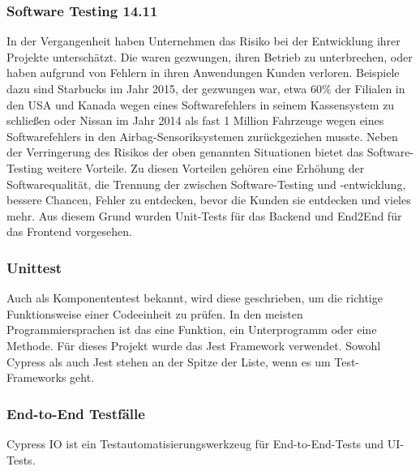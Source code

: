 \subsubsection*{Software Testing 14.11}
In der Vergangenheit haben Unternehmen das Risiko bei der Entwicklung ihrer Projekte unterschätzt. Die waren gezwungen, ihren Betrieb zu unterbrechen, oder haben aufgrund von Fehlern in ihren Anwendungen Kunden verloren. Beispiele dazu sind Starbucks im Jahr 2015, der gezwungen war, etwa 60\% der Filialen in den USA und Kanada wegen eines Softwarefehlers in seinem Kassensystem zu schließen{\cite{QS1}} oder Nissan im Jahr 2014 als fast 1 Million Fahrzeuge wegen eines Softwarefehlers in den Airbag-Sensoriksystemen zurückgeziehen musste{\cite{QS2}}. Neben der Verringerung des Risikos der oben genannten Situationen bietet das Software-Testing weitere Vorteile. Zu diesen Vorteilen gehören eine Erhöhung der Softwarequalität, die Trennung der zwischen Software-Testing und -entwicklung, bessere Chancen, Fehler zu entdecken, bevor die Kunden sie entdecken und vieles mehr. Aus diesem Grund wurden Unit-Tests für das Backend und End2End für das Frontend vorgesehen. 
\\
\subsubsection*{Unittest}
Auch als Komponententest bekannt, wird diese geschrieben, um die richtige Funktionsweise einer Codeeinheit zu prüfen. In den meisten Programmiersprachen ist das eine Funktion, ein Unterprogramm oder eine Methode. Für dieses Projekt wurde das Jest Framework verwendet. 
Sowohl Cypress als auch Jest stehen an der Spitze der Liste, wenn es um Test-Frameworks geht{\cite{QS3}}.

\subsubsection*{End-to-End Testfälle}
Cypress IO ist ein Testautomatisierungswerkzeug für End-to-End-Tests und UI-Tests. 
\\
